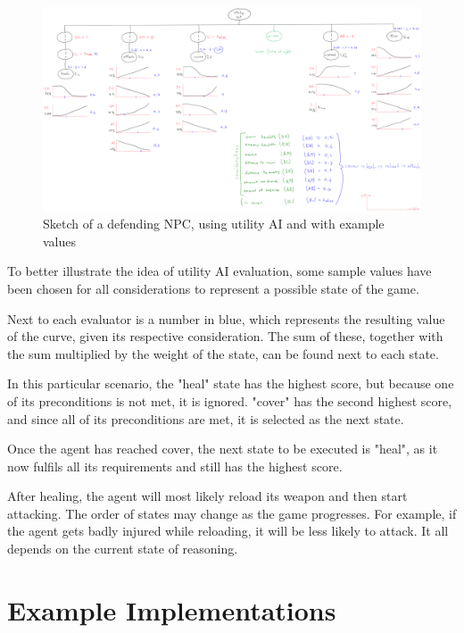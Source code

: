 \begin{figure}[H]
    \centering
    \includegraphics[scale=0.345, angle=90]{images/utility_ai_sketch_defending_ai_with_values.png}
    \caption{Sketch of a defending NPC, using utility AI and with example values}
    \label{fig:utility_ai_sketch_defending_ai_with_values}
\end{figure}

To better illustrate the idea of utility AI evaluation, some sample values have been chosen for all considerations to represent a possible state of the game.

Next to each evaluator is a number in blue, which represents the resulting value of the curve, given its respective consideration. The sum of these, together with the sum multiplied by the weight of the state, can be found next to each state.

In this particular scenario, the "heal" state has the highest score, but because one of its preconditions is not met, it is ignored. "cover" has the second highest score, and since all of its preconditions are met, it is selected as the next state.

Once the agent has reached cover, the next state to be executed is "heal", as it now fulfils all its requirements and still has the highest score.

After healing, the agent will most likely reload its weapon and then start attacking. The order of states may change as the game progresses. For example, if the agent gets badly injured while reloading, it will be less likely to attack. It all depends on the current state of reasoning.

\section{Example Implementations}
\label{sec:utilityai_exampleimplementations}
